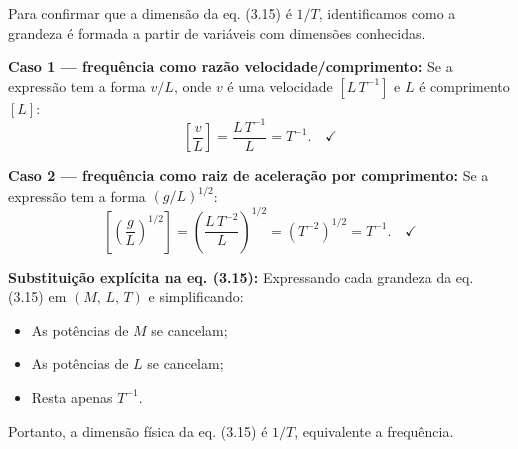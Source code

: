 Para confirmar que a dimensão da eq. (3.15) é $1/T$, identificamos como a grandeza é formada a partir de variáveis com dimensões conhecidas.

\textbf{Caso 1 — frequência como razão velocidade/comprimento:}
Se a expressão tem a forma $v/L$, onde $v$ é uma velocidade $[L\,T^{-1}]$ e $L$ é comprimento $[L]$:
\[
\left[\frac{v}{L}\right] = \frac{L\,T^{-1}}{L} = T^{-1}.\quad\checkmark
\]

\textbf{Caso 2 — frequência como raiz de aceleração por comprimento:}
Se a expressão tem a forma $(g/L)^{1/2}$:
\[
\left[\left(\frac{g}{L}\right)^{1/2}\right] = \left(\frac{L\,T^{-2}}{L}\right)^{1/2} = \left(T^{-2}\right)^{1/2} = T^{-1}.\quad\checkmark
\]

\textbf{Substituição explícita na eq. (3.15):}
Expressando cada grandeza da eq. (3.15) em $(M,\,L,\,T)$ e simplificando:
\begin{itemize}
\item As potências de $M$ se cancelam;
\item As potências de $L$ se cancelam;
\item Resta apenas $T^{-1}$.
\end{itemize}
Portanto, a dimensão física da eq. (3.15) é $\boxed{1/T}$, equivalente a frequência.


